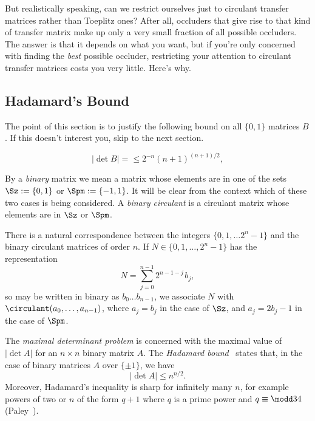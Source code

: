 But realistically speaking, can we restrict ourselves just to circulant transfer matrices rather than Toeplitz ones? After all, occluders that give rise to that kind of transfer matrix make up only a very small fraction of all possible occluders. The answer is that it depends on what you want, but if you're only concerned with finding the \emph{best} possible occluder, restricting your attention to circulant transfer matrices costs you very little. Here's why.


\subsection{Hadamard's Bound}

The point of this section is to justify the following bound on all $\{0, 1\}$ matrices $B$. If this doesn't interest you, skip to the next section.

\begin{equation}
|\det B| = \le 2^{-n}(n+1)^{(n+1)/2},	\label{eq:Hadamard0}
\end{equation}


By a \emph{binary} matrix we mean a matrix whose elements are in one of the
sets $\Sz := \{0,1\}$ or $\Spm := \{-1,1\}$. It will be clear from
the context which of these two cases is being considered.
A \emph{binary circulant} is a circulant matrix whose
elements are in $\Sz$ or $\Spm$.

There is a natural %
correspondence between the integers
\hbox{$\{0,1,\ldots 2^n-1\}$} and the binary circulant matrices of order
$n$.  If $N\in \{0,1,\ldots,2^n-1\}$ has the representation
\[N = \sum_{j=0}^{n-1} 2^{n-1-j\,}b_j,\]
so may be written in binary as $b_0 \ldots b_{n-1}$,
we associate $N$ with
$\circulant(a_0,\ldots,a_{n-1})$,
where $a_j = b_j$ in the case of $\Sz$, and $a_j = 2b_j-1$ in
the case of $\Spm$.

The \emph{maximal determinant problem} is concerned with the maximal value
of $|\det A|$ for an $n\times n$ binary matrix $A$. 
The \emph{Hadamard bound}~\cite{Hadamard93} states that, in the case of
binary matrices $A$ over $\{\pm1\}$, we have 
\begin{equation}
|\det A| \le n^{n/2}.					\label{eq:Hadamard1}
\end{equation}
Moreover, Hadamard's inequality is sharp for infinitely many $n$, for
example powers of two 
or $n$ of the form
$q+1$ where $q$ is a prime power and 
$q \equiv \modd 3 4$ (Paley~\cite{Paley33}).

